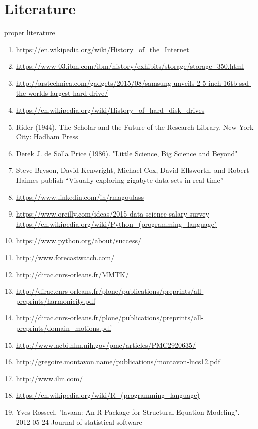 \documentclass [twoside,
  11pt, a4paper,
  footinclude=true,
  headinclude=true,
  cleardoublepage=empty
]{article}
\begin{document}
\section{Literature}
proper literature
\begin{enumerate}
    \item \url{https://en.wikipedia.org/wiki/History_of_the_Internet} 
    \item \url{https://www-03.ibm.com/ibm/history/exhibits/storage/storage_350.html}
    \item \url{http://arstechnica.com/gadgets/2015/08/samsung-unveils-2-5-inch-16tb-ssd-the-worlds-largest-hard-drive/}
    \item \url{https://en.wikipedia.org/wiki/History_of_hard_disk_drives}
    \item Rider (1944). The Scholar and the Future of the Research Library. New York City: Hadham Press
    \item Derek J. de Solla Price (1986). "Little Science, Big Science and Beyond"
    \item  Steve Bryson, David Kenwright, Michael Cox, David Ellsworth, and Robert Haimes publish “Visually exploring gigabyte data sets in real time”
    \item \url{https://www.linkedin.com/in/rmagoulass}
    \item \url{https://www.oreilly.com/ideas/2015-data-science-salary-survey}
    \ietm \url{https://en.wikipedia.org/wiki/Python_(programming_language)}
    \item \url{https://www.python.org/about/success/}
    \item \url{http://www.forecastwatch.com/}
    \item \url{http://dirac.cnrs-orleans.fr/MMTK/}
    \item \url{http://dirac.cnrs-orleans.fr/plone/publications/preprints/all-preprints/harmonicity.pdf}
    \item \url{http://dirac.cnrs-orleans.fr/plone/publications/preprints/all-preprints/domain_motions.pdf}
    \item \url{http://www.ncbi.nlm.nih.gov/pmc/articles/PMC2920635/}
    \item \url{http://gregoire.montavon.name/publications/montavon-lncs12.pdf}
    \item \url{http://www.ilm.com/}
    \item \url{https://en.wikipedia.org/wiki/R_(programming_language)}
    \item Yves Rosseel, "lavaan: An R Package for Structural Equation Modeling". 2012-05-24 Journal of statistical software

\end{enumerate}
\end{document}
